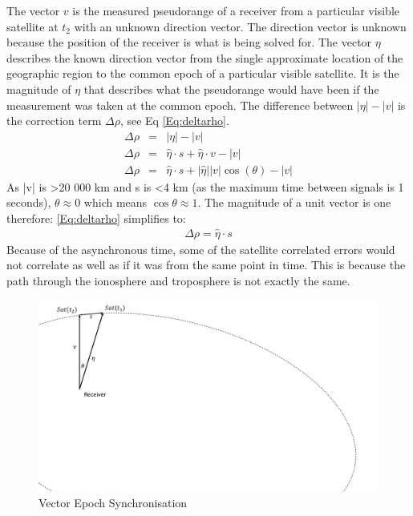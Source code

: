 The vector $v$ is the measured pseudorange of a receiver from a particular visible satellite at $t_2$ with an unknown direction vector. The direction vector is unknown because the position of the receiver is what is being solved for. The vector $\eta$ describes the known direction vector from the single approximate location of the geographic region to the common epoch of a particular visible satellite. It is the magnitude of $\eta$ that describes what the pseudorange would have been if the measurement was taken at the common epoch. The difference between $|\eta|-|v|$ is the correction term $\Delta\rho$, see Eq \eqref{Eq:deltarho}.
\begin{eqnarray}
\Delta \rho &=& |\eta| - |v|\\ %
\Delta \rho&=& \hat{\eta}\cdot s + \hat{\eta}\cdot v - |v|\\
\Delta \rho&=& \hat{\eta}\cdot s + |\hat{\eta}||v|\cos(\theta) - |v| \label{Eq:deltarho}
\end{eqnarray}
As |v| is >20 000 km and s is <4 km (as the maximum time between signals is 1 seconds), $\theta\approx 0$ which means $\cos\theta\approx1$. The magnitude of a unit vector is one therefore: \eqref{Eq:deltarho} simplifies to:
\begin{eqnarray}
\Delta\rho = \hat{\eta}\cdot s 
\end{eqnarray}
Because of the asynchronous time, some of the satellite correlated errors would not correlate as well as if it was from the same point in time. This is because the path through the ionosphere and troposphere is not exactly the same. 
\begin{figure}[h]
\centering
\caption{Vector Epoch Synchronisation}
\label{Fig:epochsync}
\includegraphics[trim=0 10cm 23cm 0,clip,width=0.3\linewidth]{ChapterPerception/Figures/epochalignment.pdf}
\end{figure}










